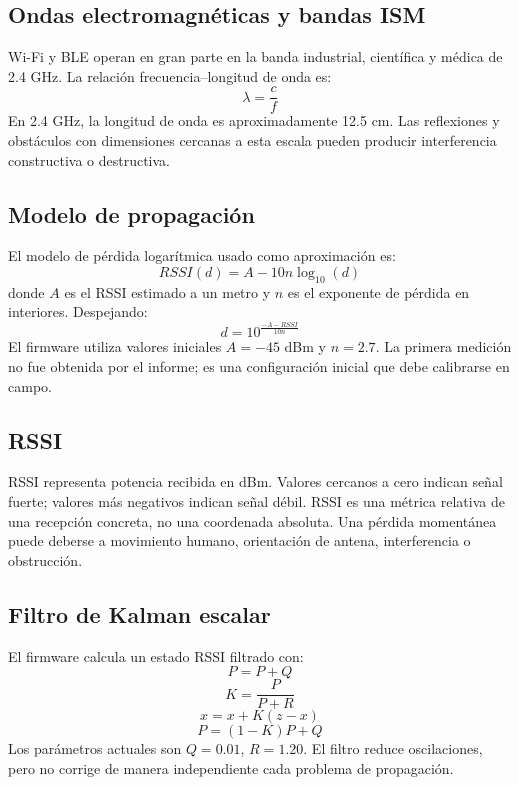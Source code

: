 \documentclass[12pt,a4paper]{article}
\begin{document}
\subsection{Ondas electromagnéticas y bandas ISM}
Wi-Fi y BLE operan en gran parte en la banda industrial, científica y médica de 2.4 GHz. La relación frecuencia--longitud de onda es:
\[
\lambda=\frac{c}{f}
\]
En 2.4 GHz, la longitud de onda es aproximadamente 12.5 cm. Las reflexiones y obstáculos con dimensiones cercanas a esta escala pueden producir interferencia constructiva o destructiva.

\subsection{Modelo de propagación}
El modelo de pérdida logarítmica usado como aproximación es:
\[
RSSI(d)=A-10n\log_{10}(d)
\]
donde $A$ es el RSSI estimado a un metro y $n$ es el exponente de pérdida en interiores. Despejando:
\[
d=10^{\frac{-A-RSSI}{10n}}
\]
El firmware utiliza valores iniciales $A=-45$ dBm y $n=2.7$. La primera medición no fue obtenida por el informe; es una configuración inicial que debe calibrarse en campo.

\subsection{RSSI}
RSSI representa potencia recibida en dBm. Valores cercanos a cero indican señal fuerte; valores más negativos indican señal débil. RSSI es una métrica relativa de una recepción concreta, no una coordenada absoluta. Una pérdida momentánea puede deberse a movimiento humano, orientación de antena, interferencia o obstrucción.

\subsection{Filtro de Kalman escalar}
El firmware calcula un estado RSSI filtrado con:
\[
P=P+Q
\]
\[
K=\frac{P}{P+R}
\]
\[
x=x+K(z-x)
\]
\[
P=(1-K)P+Q
\]
Los parámetros actuales son $Q=0.01$, $R=1.20$. El filtro reduce oscilaciones, pero no corrige de manera independiente cada problema de propagación.
\end{document}
